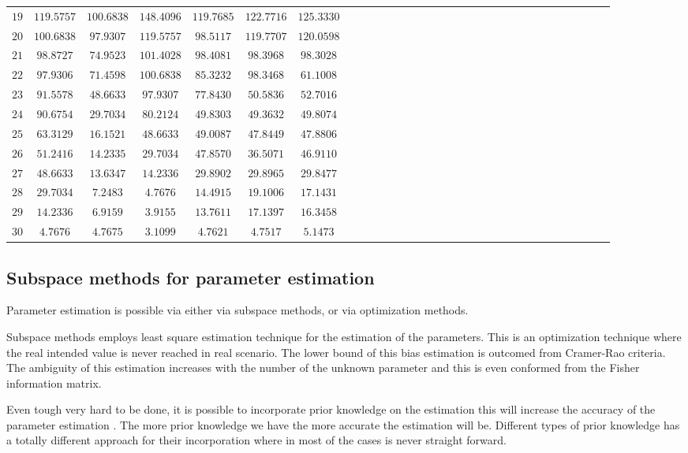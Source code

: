 \begin{table}[!htbp]
\begin{tabular}{c c c c c c c c c c c c c c c c c c c c c c c c c c c c c c c }
$19$&$  119.5757$&$100.6838$&$148.4096$&$119.7685$&$122.7716$&$125.3330$\\
$20 $&$ 100.6838$&$97.9307$&$119.5757$&$98.5117$&$119.7707$&$120.0598$\\
$21 $ &$ 98.8727$&$74.9523$&$101.4028$&$98.4081$&$98.3968$&$98.3028$\\
$22$&$   97.9306$&$71.4598$&$100.6838$&$85.3232$&$98.3468$&$ 61.1008$\\
$23$ &$  91.5578$&$48.6633$&$97.9307$&$77.8430$&$50.5836$&$52.7016$\\
$24$  &$ 90.6754$&$29.7034$&$80.2124$&$49.8303$&$49.3632$&$49.8074$\\
$25$&$   63.3129$&$16.1521$&$48.6633$&$49.0087$&$47.8449$&$47.8806$\\
$26$ &$  51.2416$&$14.2335$&$29.7034$&$47.8570$&$36.5071$&$46.9110$\\
$27 $ &$ 48.6633$&$13.6347$&$14.2336$&$29.8902$&$29.8965$&$29.8477$\\
$28 $  &$29.7034$&$ 7.2483$&$ 4.7676$&$14.4915$&$19.1006$&$17.1431$\\
$29 $  &$14.2336$&$ 6.9159$&$ 3.9155$&$13.7611$&$17.1397$&$16.3458$\\
$30 $   &$4.7676$&$ 4.7675$&$ 3.1099$&$4.7621$&$4.7517$&$5.1473$\\
   \hline 

\end{tabular}
\end{table}  
    
    
      
\newpage
\subsection{Subspace methods for parameter estimation}
 Parameter estimation is possible via either via subspace methods, or via optimization methods.
 
 Subspace methods employs least square estimation technique for the estimation of the parameters. This is an optimization technique where the real intended value is never reached in real scenario. The lower bound of this bias estimation is outcomed from Cramer-Rao criteria. The ambiguity of this estimation increases with the number of the unknown parameter and this is even conformed from the Fisher information matrix. 
 
 
Even tough very hard to be done, it is possible to incorporate prior knowledge on the estimation this will increase the accuracy of the parameter estimation \cite{7}. The more prior knowledge we have the more accurate the estimation will be. Different types of prior knowledge has a totally different approach for their incorporation where in most of the cases is never straight forward\cite{8}.

